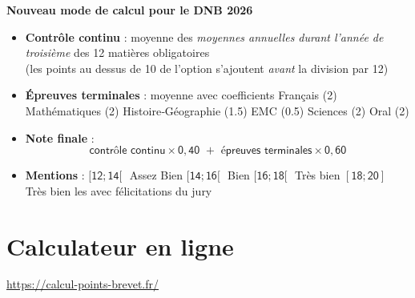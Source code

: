 \documentclass[11pt,a5paper]{article}
\begin{document}
\vspace*{2em}
\begin{tcolorbox}[colback=red!10!white, colframe=red!80!black]
\begin{center}
\Large\textbf{Nouveau mode de calcul pour le DNB 2026}
\end{center}
\end{tcolorbox}
\vspace{1em}
\begin{itemize}[leftmargin=1.1em,itemsep=1.2em]
\item \textbf{Contrôle continu} : moyenne des \emph{moyennes annuelles durant l’année de troisième} des 12 matières obligatoires\\
\vspace{0.2em}
(les points au dessus de 10 de l'option s’ajoutent \emph{avant} la division par 12)
\item \textbf{Épreuves terminales} : moyenne avec coefficients 
\subitem Français (2)
\subitem Mathématiques (2)
\subitem Histoire‑Géographie (1.5)
\subitem EMC (0.5)
\subitem Sciences (2)
\subitem Oral (2)
\item \textbf{Note finale} :
\vspace{-0.4em}
\[ \mathsf{\textsf{contrôle continu} \times 0,40 \,\, + \,\, \textsf{épreuves terminales} \times 0,60} \]
\item \textbf{Mentions} :
\subitem $\mathsf{[12;14[}\,\,$ Assez Bien
\subitem $\mathsf{[14; 16[}\,\,$ Bien
\subitem $\mathsf{[16; 18[}\,\,$ Très bien
\subitem $\mathsf{[18; 20]}\,\,$ Très bien les avec félicitations du jury
\end{itemize}

\section*{Calculateur en ligne}
\url{https://calcul-points-brevet.fr/}
\newpage
\end{document}
